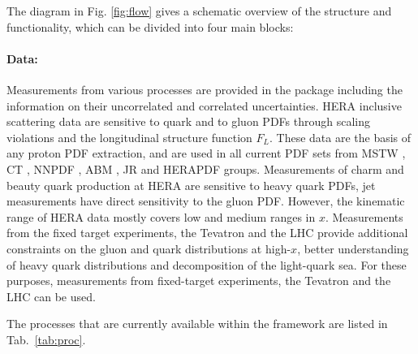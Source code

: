 %
\label{sec:structure}


The diagram in Fig. \ref{fig:flow} gives a schematic overview
of the \fitter structure and functionality, which can be divided into four main blocks:

\paragraph{Data:} Measurements from various processes
are provided in the \fitter package including the information on their uncorrelated 
and correlated uncertainties. HERA inclusive scattering data 
are sensitive to quark and to gluon PDFs through scaling violations and the longitudinal structure function $F_L$.  
These data are the basis of any proton PDF extraction, and are used in all current PDF sets 
from MSTW \cite{MSTWpdf}, CT \cite{CT10pdf}, NNPDF \cite{NNPDFpdf}, ABM \cite{Alekhin:2013nda}, JR \cite{Jimenez-Delgado:2014twa} 
and HERAPDF \cite{h1zeus:2009wt} groups. Measurements of charm and beauty quark production at HERA are 
sensitive to heavy quark PDFs, jet measurements have direct sensitivity to the gluon PDF. However, the kinematic range 
of HERA data mostly covers low and medium ranges in $x$.
Measurements from the fixed target experiments, the Tevatron and the LHC provide additional constraints
on the gluon and quark distributions at high-$x$, better understanding of heavy quark 
distributions and decomposition of the light-quark sea. For these purposes, measurements from fixed-target
experiments, the Tevatron and the LHC can be used.

%
%
The processes that are currently available within the \fitter framework are listed in Tab.~\ref{tab:proc}.

